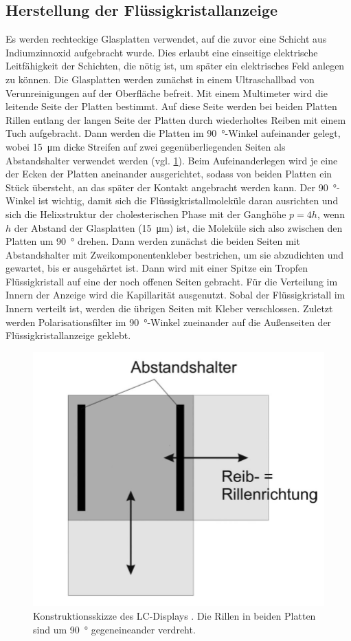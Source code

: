 \documentclass[
	a4paper,
	12pt,
	pagesize,
	ngerman
]{scrartcl}
\begin{document}
	\subsection{Herstellung der Flüssigkristallanzeige}
	Es werden rechteckige Glasplatten verwendet, auf die zuvor eine Schicht aus Indiumzinnoxid aufgebracht wurde.
	Dies erlaubt eine einseitige elektrische Leitfähigkeit der Schichten, die nötig ist, um später ein elektrisches Feld anlegen zu können.
	Die Glasplatten werden zunächst in einem Ultraschallbad von Verunreinigungen auf der Oberfläche befreit.
	Mit einem Multimeter wird die leitende Seite der Platten bestimmt.
	Auf diese Seite werden bei beiden Platten Rillen entlang der langen Seite der Platten durch wiederholtes Reiben mit einem Tuch aufgebracht.
	Dann werden die Platten im \SI{90}{\degree}-Winkel aufeinander gelegt, wobei \SI{15}{\micro \meter} dicke Streifen auf zwei gegenüberliegenden Seiten als Abstandshalter verwendet werden (vgl. \cref{fig_ohnestern}).
	Beim Aufeinanderlegen wird je eine der Ecken der Platten aneinander ausgerichtet, sodass von beiden Platten ein Stück übersteht, an das später der Kontakt angebracht werden kann.
	Der \SI{90}{\degree}-Winkel ist wichtig, damit sich die Flüssigkristallmoleküle daran ausrichten und sich die Helixstruktur der cholesterischen Phase mit der Ganghöhe $p=4h$, wenn $h$ der Abstand der Glasplatten (\SI{15}{\micro \meter}) ist, die Moleküle sich also zwischen den Platten um \SI{90}{\degree} drehen.
	Dann werden zunächst die beiden Seiten mit Abstandshalter mit Zweikomponentenkleber bestrichen, um sie abzudichten und gewartet, bis er ausgehärtet ist.
	Dann wird mit einer Spitze ein Tropfen Flüssigkristall auf eine der noch offenen Seiten gebracht. Für die Verteilung im Innern der Anzeige wird die Kapillarität ausgenutzt.
  Sobal der Flüssigkristall im Innern verteilt ist, werden die übrigen Seiten mit Kleber verschlossen.
	Zuletzt werden Polarisationsfilter im \SI{90}{\degree}-Winkel zueinander auf die Außenseiten der Flüssigkristallanzeige geklebt.

	\begin{figure}[H]
			\includegraphics[width=0.5\linewidth]{images/ohnestern.PNG}
			\caption{
			Konstruktionsskizze des LC-Displays \cite{imp08}. Die Rillen in beiden Platten sind um \SI{90}{\degree} gegeneineander verdreht.
			}
			\label{fig_ohnestern}
	\end{figure}
\end{document}
